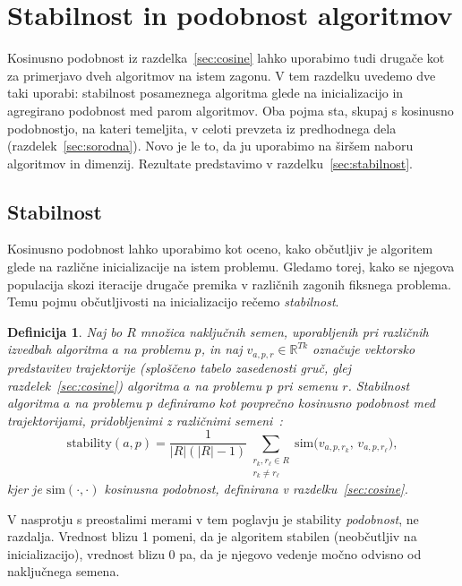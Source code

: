 \documentclass[a4paper, 12pt]{book}
\newtheorem{definicija}[izrek]{Definicija}
\begin{document}
\section{Stabilnost in podobnost algoritmov}
\label{sec:stabilnost-def}

Kosinusno podobnost iz razdelka~\ref{sec:cosine} lahko uporabimo tudi
drugače kot za primerjavo dveh algoritmov na istem zagonu. V tem razdelku
uvedemo dve taki uporabi: stabilnost posameznega algoritma glede na
inicializacijo in agregirano podobnost med parom algoritmov. Oba pojma sta,
skupaj s kosinusno podobnostjo, na kateri temeljita, v celoti prevzeta iz
predhodnega dela~\cite{clustopt2025} (razdelek~\ref{sec:sorodna}). Novo je le
to, da ju uporabimo na širšem naboru algoritmov in dimenzij. Rezultate
predstavimo v razdelku~\ref{sec:stabilnost}.

\subsection{Stabilnost}

Kosinusno podobnost lahko uporabimo kot oceno, kako občutljiv je algoritem
glede na različne inicializacije na istem problemu. Gledamo torej, kako se
njegova populacija skozi iteracije drugače premika v različnih zagonih
fiksnega problema. Temu pojmu občutljivosti na inicializacijo rečemo
\emph{stabilnost}.

\begin{definicija}
\label{def:stabilnost}
    Naj bo $R$ množica naključnih semen, uporabljenih pri različnih izvedbah
algoritma $a$ na problemu $p$, in naj $v_{a,p,r} \in \mathbb{R}^{Tk}$
označuje vektorsko predstavitev trajektorije (sploščeno tabelo zasedenosti
gruč, glej razdelek~\ref{sec:cosine}) algoritma $a$ na problemu $p$ pri
semenu $r$. Stabilnost algoritma $a$ na problemu $p$ definiramo kot
povprečno kosinusno podobnost med trajektorijami, pridobljenimi z različnimi
semeni~\cite{clustopt2025}:
\[
    \mathrm{stability}(a, p) = \frac{1}{|R|(|R|-1)}
    \sum_{\substack{r_k, r_\ell \in R \\ r_k \neq r_\ell}}
    \mathrm{sim}\bigl(v_{a,p,r_k},\, v_{a,p,r_\ell}\bigr),
\]
kjer je $\mathrm{sim}(\cdot,\cdot)$ kosinusna podobnost, definirana v
razdelku~\ref{sec:cosine}.
\end{definicija}

V nasprotju s preostalimi merami v tem poglavju je $\mathrm{stability}$
\emph{podobnost}, ne razdalja. Vrednost blizu 1 pomeni, da je algoritem
stabilen (neobčutljiv na inicializacijo), vrednost blizu 0 pa, da je njegovo
vedenje močno odvisno od naključnega semena.
\end{document}
